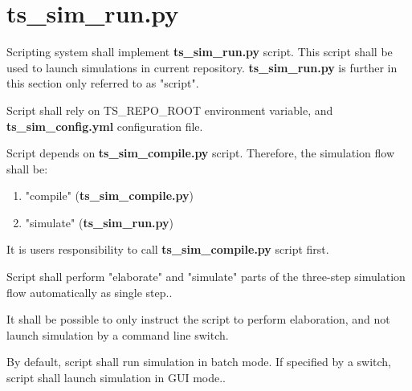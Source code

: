 \documentclass{tropic_design_spec}
\begin{document}
\section{ts_sim_run.py}



    {Scripting system shall implement \textbf{ts_sim_run.py} script. This script shall be
     used to launch simulations in current repository. \textbf{ts_sim_run.py} is further
     in this section only referred to as "script".}


    {Script shall rely on TS_REPO_ROOT environment variable, and \textbf{ts_sim_config.yml}
     configuration file.}


    {Script depends on \textbf{ts_sim_compile.py} script. Therefore, the simulation flow
     shall be:
    \begin{enumerate}			
        \item{"compile" (\textbf{ts_sim_compile.py})}
        \item{"simulate" (\textbf{ts_sim_run.py})}
    \end{enumerate}
     It is users responsibility to call \textbf{ts_sim_compile.py} script first.}


    {Script shall perform "elaborate" and "simulate" parts of the three-step simulation
     flow automatically as single step.}.	


    {It shall be possible to only instruct the script to perform elaboration, and not
     launch simulation by a command line switch}.


    {By default, script shall run simulation in batch mode. If specified by a switch,
     script shall launch simulation in GUI mode.}.
\ReqSubStart
\ReqSubEnd
\end{document}

